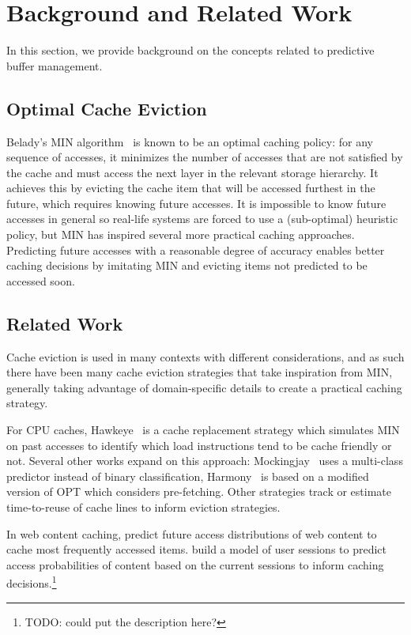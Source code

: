 
\chapter{Background and Related Work}
In this section, we provide background on the concepts related to predictive buffer management.

\section{Optimal Cache Eviction}

Belady's MIN algorithm~\cite{beladyMIN} is known to be an optimal caching policy: for any sequence of accesses, it minimizes the number of accesses that are not satisfied by the cache and must access the next layer in the relevant storage hierarchy. It achieves this by evicting the cache item that will be accessed furthest in the future, which requires knowing future accesses. It is impossible to know future accesses in general so real-life systems are forced to use a (sub-optimal) heuristic policy, but MIN has inspired several more practical caching approaches. Predicting future accesses with a reasonable degree of accuracy enables better caching decisions by imitating MIN and evicting items not predicted to be accessed soon.


\section{Related Work}

Cache eviction is used in many contexts with different considerations, and as such there have been many cache eviction strategies that take inspiration from MIN, generally taking advantage of domain-specific details to create a practical caching strategy.

For CPU caches, Hawkeye~\cite{jain2016back} is a cache replacement strategy which simulates MIN on past accesses to identify which load instructions tend to be cache friendly or not. Several other works expand on this approach: Mockingjay~\cite{shah2022effective} uses a multi-class predictor instead of binary classification, Harmony~\cite{jain2018rethinking} is based on a modified version of OPT which considers pre-fetching. Other strategies track or estimate time-to-reuse of cache lines to inform eviction strategies. \cite{keramidas2007cache, wu2011ship} %

In web content caching, \citet{famaey2013towards} predict future access distributions of web content to cache most frequently accessed items. \citet{yang2003web} build a model of user sessions to predict access probabilities of content based on the current sessions to inform caching decisions.\footnote{TODO: could put the \cite{relaxedBelady} description here?}


